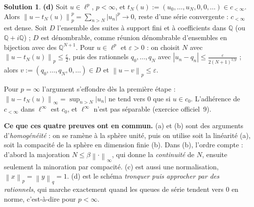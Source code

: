 \documentclass[11pt,a4paper]{article}
\newcommand{\Q}{\mathbb{Q}}
\newcommand{\norm}[1]{\left\|#1\right\|}
\theoremstyle{definition}
\newtheorem*{solution}{Solution}
\begin{document}
\begin{solution}
\medskip
\noindent\textbf{(d)} Soit $u\in\ell^p$, $p<\infty$, et $t_N(u):=(u_0,\dots,u_N,0,0,\dots)\in c_{<\infty}$. Alors $\norm{u-t_N(u)}_p^p=\sum_{n>N}|u_n|^p\to0$, reste d'une série convergente : $c_{<\infty}$ est dense. Soit $D$ l'ensemble des suites à support fini et à coefficients dans $\Q$ (ou $\Q+i\Q$) ; $D$ est dénombrable, comme réunion dénombrable d'ensembles en bijection avec des $\Q^{N+1}$. Pour $u\in\ell^p$ et $\varepsilon>0$ : on choisit $N$ avec $\norm{u-t_N(u)}_p\le\frac\varepsilon2$, puis des rationnels $q_0,\dots,q_N$ avec $|u_n-q_n|\le\frac\varepsilon{2(N+1)^{1/p}}$ ; alors $v:=(q_0,\dots,q_N,0,\dots)\in D$ et $\norm{u-v}_p\le\varepsilon$.

Pour $p=\infty$ l'argument s'effondre dès la première étape : $\norm{u-t_N(u)}_\infty=\sup_{n>N}|u_n|$ ne tend vers $0$ que si $u\in c_0$. L'adhérence de $c_{<\infty}$ dans $\ell^\infty$ est $c_0$, et $\ell^\infty$ n'est pas séparable (exercice officiel~9).
\end{solution}

\begin{methode}
\textbf{Ce que ces quatre preuves ont en commun.} (a) et (b) sont des arguments d'\emph{homogénéité} : on se ramène à la sphère unité, puis on utilise soit la linéarité (a), soit la compacité de la sphère en dimension finie (b). Dans (b), l'ordre compte : d'abord la majoration $N\le\beta\norm\cdot_\infty$, qui donne la \emph{continuité} de $N$, ensuite seulement la minoration par compacité. (c) est aussi une normalisation, $\norm x_p=\norm y_q=1$. (d) est le schéma \emph{tronquer puis approcher par des rationnels}, qui marche exactement quand les queues de série tendent vers $0$ en norme, c'est-à-dire pour $p<\infty$.
\end{methode}
\end{document}

